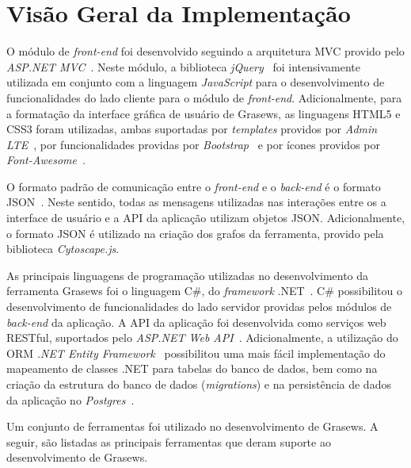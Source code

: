 \section{Visão Geral da Implementação}\label{4-grasews-visao-geral-implementacao}

O módulo de \textit{front-end} foi desenvolvido seguindo a arquitetura MVC provido pelo \textit{ASP.NET MVC}~\cite{MICROSOFT-2019-ASP-NET-MVC}. Neste módulo, a biblioteca \textit{jQuery}~\cite{JQUERY-2019} foi intensivamente utilizada em conjunto com a linguagem \textit{JavaScript} para o desenvolvimento de funcionalidades do lado cliente para o módulo de \textit{front-end}. Adicionalmente, para a formatação da interface gráfica de usuário de Grasews, as linguagens HTML5 e CSS3 foram utilizadas, ambas suportadas por \textit{templates} providos por \textit{Admin LTE}~\cite{ADMIN-LTE-2019}, por funcionalidades providas por \textit{Bootstrap}~\cite{BOOTSTRAP-2019} e por ícones providos por \textit{Font-Awesome}~\cite{FONT-AWESOME-2019}.

O formato padrão de comunicação entre o \textit{front-end} e o \textit{back-end} é o formato JSON~\cite{JSON-2019}. Neste sentido, todas as mensagens utilizadas nas interações entre os a interface de usuário e a API da aplicação utilizam objetos JSON. Adicionalmente, o formato JSON é utilizado na criação dos grafos da ferramenta, provido pela biblioteca \textit{Cytoscape.js}\cite{CYTOSCAPE-2015}.

As principais linguagens de programação utilizadas no desenvolvimento da ferramenta Grasews foi o linguagem C\#, do \textit{framework} .NET~\cite{MICROSOFT-2019-NET-FRAMEWORK}. C\# possibilitou o desenvolvimento de funcionalidades do lado servidor providas pelos módulos de \textit{back-end} da aplicação. A API da aplicação foi desenvolvida como serviços web RESTful, suportados pelo \textit{ASP.NET Web API}~\cite{MICROSOFT-2019-WEB-API}. Adicionalmente, a utilização do ORM \textit{.NET Entity Framework}~\cite{MICROSOFT-2019-Entity-Framework} possibilitou uma mais fácil implementação do mapeamento de classes .NET para tabelas do banco de dados, bem como na criação da estrutura do banco de dados (\textit{migrations}) e na persistência de dados da aplicação no \textit{Postgres}~\cite{POSTGRES-2019}.

Um conjunto de ferramentas foi utilizado no desenvolvimento de Grasews. A seguir, são listadas as principais ferramentas que deram suporte ao desenvolvimento de Grasews.

